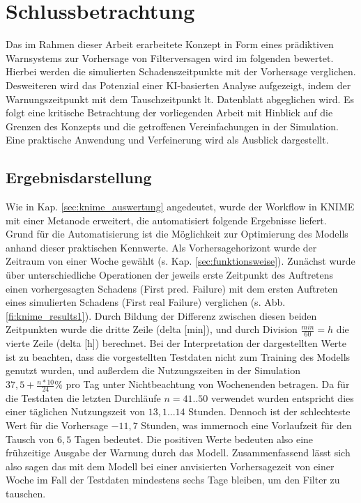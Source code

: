 \chapter{Schlussbetrachtung}
\label{ch:schluss}
    Das im Rahmen dieser Arbeit erarbeitete Konzept in Form eines prädiktiven Warnsystems zur Vorhersage von Filterversagen wird im folgenden bewertet. Hierbei werden die simulierten Schadenszeitpunkte mit der Vorhersage verglichen. Desweiteren wird das Potenzial einer KI-basierten Analyse aufgezeigt, indem der Warnungszeitpunkt mit dem Tauschzeitpunkt lt. Datenblatt abgeglichen wird. Es folgt eine kritische Betrachtung der vorliegenden Arbeit mit Hinblick auf die Grenzen des Konzepts und die getroffenen Vereinfachungen in der Simulation. Eine praktische Anwendung und Verfeinerung wird als Ausblick dargestellt. 
    \section{Ergebnisdarstellung}
    \label{sec:ergebnisse}
    Wie in Kap. \ref{sec:knime_auswertung} angedeutet, wurde der Workflow in \ac{KNIME} mit einer Metanode erweitert, die automatisiert folgende Ergebnisse liefert. Grund für die Automatisierung ist die Möglichkeit zur Optimierung des Modells anhand dieser praktischen Kennwerte. Als Vorhersagehorizont wurde der Zeitraum von einer Woche gewählt (s. Kap. \ref{sec:funktionsweise}). Zunächst wurde über unterschiedliche Operationen der jeweils erste Zeitpunkt des Auftretens einen vorhergesagten Schadens (First pred. Failure) mit dem ersten Auftreten eines simulierten Schadens (First real Failure) verglichen (s. Abb. \ref{fi:knime_results1}). Durch Bildung der Differenz zwischen diesen beiden Zeitpunkten wurde die dritte Zeile (delta [min]), und durch Division $\frac{min}{60}=h$ die vierte Zeile (delta [h]) berechnet. Bei der Interpretation der dargestellten Werte ist zu beachten, dass die vorgestellten Testdaten nicht zum Training des Modells genutzt wurden, und außerdem die Nutzungszeiten in der Simulation $37,5+\frac{n*10}{24} \% $ pro Tag unter Nichtbeachtung von Wochenenden betragen. Da für die Testdaten die letzten Durchläufe $n=41..50$ verwendet wurden entspricht dies einer täglichen Nutzungszeit von 
    $ 13,1...14$ Stunden. Dennoch ist der schlechteste Wert für die Vorhersage $-11,7$ Stunden, was immernoch eine Vorlaufzeit für den Tausch von $6,5$ Tagen bedeutet. Die positiven Werte bedeuten also eine frühzeitige Ausgabe der Warnung durch das Modell. Zusammenfassend lässt sich also sagen das mit dem Modell bei einer anvisierten Vorhersagezeit von einer Woche im Fall der Testdaten mindestens sechs Tage bleiben, um den Filter zu tauschen.
